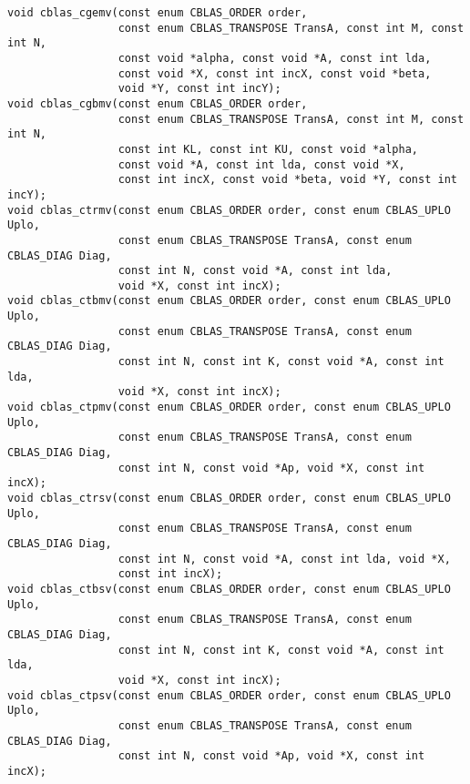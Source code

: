\documentclass{article}
\begin{document}
\begin{Verbatim}[fontsize=\small,fontfamily=tt,fontshape=rm]
void cblas_cgemv(const enum CBLAS_ORDER order,
                 const enum CBLAS_TRANSPOSE TransA, const int M, const int N,
                 const void *alpha, const void *A, const int lda,
                 const void *X, const int incX, const void *beta,
                 void *Y, const int incY);
void cblas_cgbmv(const enum CBLAS_ORDER order,
                 const enum CBLAS_TRANSPOSE TransA, const int M, const int N,
                 const int KL, const int KU, const void *alpha,
                 const void *A, const int lda, const void *X,
                 const int incX, const void *beta, void *Y, const int incY);
void cblas_ctrmv(const enum CBLAS_ORDER order, const enum CBLAS_UPLO Uplo,
                 const enum CBLAS_TRANSPOSE TransA, const enum CBLAS_DIAG Diag,
                 const int N, const void *A, const int lda, 
                 void *X, const int incX);
void cblas_ctbmv(const enum CBLAS_ORDER order, const enum CBLAS_UPLO Uplo,
                 const enum CBLAS_TRANSPOSE TransA, const enum CBLAS_DIAG Diag,
                 const int N, const int K, const void *A, const int lda, 
                 void *X, const int incX);
void cblas_ctpmv(const enum CBLAS_ORDER order, const enum CBLAS_UPLO Uplo,
                 const enum CBLAS_TRANSPOSE TransA, const enum CBLAS_DIAG Diag,
                 const int N, const void *Ap, void *X, const int incX);
void cblas_ctrsv(const enum CBLAS_ORDER order, const enum CBLAS_UPLO Uplo,
                 const enum CBLAS_TRANSPOSE TransA, const enum CBLAS_DIAG Diag,
                 const int N, const void *A, const int lda, void *X,
                 const int incX);
void cblas_ctbsv(const enum CBLAS_ORDER order, const enum CBLAS_UPLO Uplo,
                 const enum CBLAS_TRANSPOSE TransA, const enum CBLAS_DIAG Diag,
                 const int N, const int K, const void *A, const int lda,
                 void *X, const int incX);
void cblas_ctpsv(const enum CBLAS_ORDER order, const enum CBLAS_UPLO Uplo,
                 const enum CBLAS_TRANSPOSE TransA, const enum CBLAS_DIAG Diag,
                 const int N, const void *Ap, void *X, const int incX);


\end{Verbatim}
\end{document}
